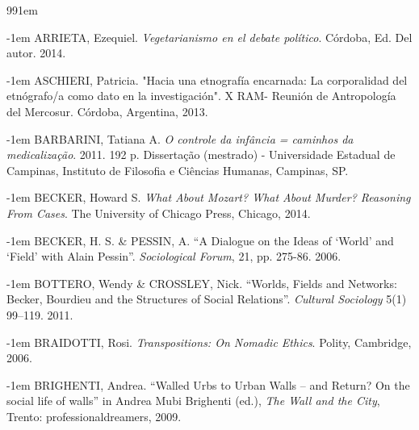 \backmatter


% 



\def\bibindent{1em}
\begin{thebibliography}{99\kern\bibindent}
\makeatletter
\let\old@biblabel\@biblabel
\def\@biblabel#1{\old@biblabel{#1}\kern\bibindent}
\let\old@bibitem\bibitem
\def\bibitem#1{\old@bibitem{#1}\leavevmode\kern-\bibindent}
\makeatother

\bibitem{} ARRIETA, Ezequiel. 
\textit{Vegetarianismo en el debate político}. Córdoba, Ed. Del autor. 2014.

\bibitem{} ASCHIERI, Patricia. "Hacia una etnografía encarnada: La corporalidad del etnógrafo/a como dato en la investigación". X RAM- Reunión de Antropología del Mercosur. Córdoba, Argentina, 2013. 

\bibitem{} BARBARINI, Tatiana A. 
\textit{O controle da infância = caminhos da medicalização}. 2011. 192 p. Dissertação (mestrado) - Universidade Estadual de Campinas, Instituto de Filosofia e Ciências Humanas, Campinas, SP.


\bibitem{} BECKER, Howard S. \textit{What About Mozart? What About Murder? Reasoning From Cases}. The University of Chicago Press, Chicago, 2014.

\bibitem{} BECKER, H. S. \& PESSIN, A. 
``A Dialogue on the Ideas of `World' and `Field' with Alain Pessin''. \textit{Sociological Forum}, 21, pp. 275-86. 2006.

\bibitem{} BOTTERO, Wendy \& CROSSLEY, Nick. 
“Worlds, Fields and Networks: Becker, Bourdieu and the Structures of Social Relations”. \textit{Cultural Sociology} 5(1) 99–119. 2011.

\bibitem{} BRAIDOTTI, Rosi. \textit{Transpositions: On Nomadic Ethics}. Polity, Cambridge, 2006.

\bibitem{} BRIGHENTI, Andrea. ``Walled Urbs to Urban Walls – and Return? On the social life of walls'' in 
Andrea Mubi Brighenti (ed.), \textit{The Wall and the City}, Trento: professionaldreamers, 2009.



\end{thebibliography}
